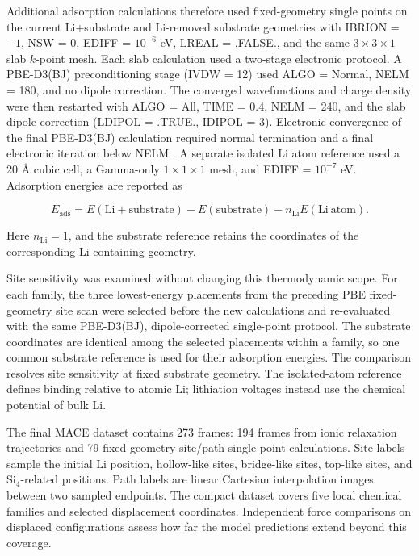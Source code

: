 \documentclass[12pt]{article}
\begin{document}
Additional adsorption calculations therefore used fixed-geometry single points on
the current Li+substrate and Li-removed substrate geometries with IBRION = $-1$,
NSW = 0, EDIFF = $10^{-6}$ eV, LREAL = .FALSE., and the same
$3\times3\times1$ slab $k$-point mesh. Each slab calculation used a
two-stage electronic protocol. A PBE-D3(BJ) preconditioning stage (IVDW = 12)
used ALGO = Normal, NELM = 180, and no dipole correction. The converged
wavefunctions and charge density were then restarted with ALGO = All,
TIME = 0.4, NELM = 240, and the slab dipole correction
(LDIPOL = .TRUE., IDIPOL = 3). Electronic convergence of the final PBE-D3(BJ)
calculation required normal termination and a final electronic iteration below NELM
\citep{grimme2010d3,grimme2011bj}. A separate isolated Li atom reference used
a 20 \AA{} cubic cell, a Gamma-only $1\times1\times1$ mesh, and
EDIFF = $10^{-7}$ eV. Adsorption energies are reported as
\begin{linenomath}
\begin{equation}
  E_{\mathrm{ads}} = E(\mathrm{Li+substrate}) - E(\mathrm{substrate}) - n_{\mathrm{Li}}E(\mathrm{Li\ atom}).
\end{equation}
\end{linenomath}
Here $n_{\mathrm{Li}}=1$, and the substrate reference retains the coordinates
of the corresponding Li-containing geometry.

Site sensitivity was examined without changing this thermodynamic scope. For
each family, the three lowest-energy placements from the preceding PBE
fixed-geometry site scan were selected before the new calculations and
re-evaluated with the same PBE-D3(BJ), dipole-corrected single-point protocol.
The substrate coordinates are identical among the selected placements within a
family, so one common substrate reference is used for their adsorption energies.
The comparison resolves site sensitivity at fixed substrate geometry.
The isolated-atom reference defines binding relative to atomic Li; lithiation
voltages instead use the chemical potential of bulk Li.

The final MACE dataset contains 273 frames: 194 frames from ionic relaxation trajectories and 79 fixed-geometry site/path single-point calculations. Site labels sample the initial Li position, hollow-like sites, bridge-like sites, top-like sites, and Si$_4$-related positions. Path labels are linear Cartesian interpolation images between two sampled endpoints. The compact dataset covers five local chemical families and selected displacement coordinates. Independent force comparisons on displaced configurations assess how far the model predictions extend beyond this coverage.
\end{document}
